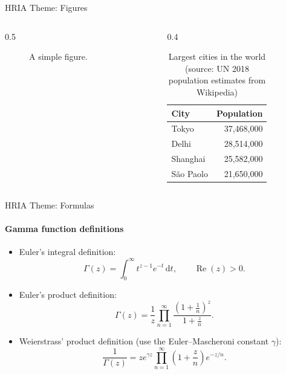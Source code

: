 \documentclass[aspectratio=169]{beamer}
\begin{document}
\begin{frame}{HRIA Theme: Figures}

\begin{columns}
\begin{column}{0.5\textwidth}
\begin{figure}
\caption{A simple figure.}
\end{figure}
\end{column}

\begin{column}{0.4\textwidth}
\centering
\begin{table}
\caption{Largest cities in the world (source: UN 2018 population estimates
from Wikipedia)}
\begin{tabular}{@{} lr @{}}
    \toprule
    City & Population\\
    \midrule
    Tokyo & 37,468,000 \\
    Delhi & 28,514,000 \\
    Shanghai & 25,582,000 \\
    São Paolo & 21,650,000 \\
    \bottomrule
\end{tabular}
\end{table}
\end{column}
\end{columns}
\end{frame}

\begin{frame}{HRIA Theme: Formulas}
\framesubtitle{Gamma function definitions}

\begin{itemize}
    \item Euler's integral definition:
    \[
    \Gamma(z) = \int_0^{\infty} t^{z-1} e^{-t} \, \mathrm{d}t, \qquad \operatorname{Re}(z) > 0.
    \]
    \item Euler's product definition:
    \[
    \Gamma(z) = \frac{1}{z} \prod_{n=1}^{\infty} \frac{\left(1 + \tfrac{1}{n}\right)^z}{1 + \tfrac{z}{n}}.
    \]
    \item Weierstrass' product definition (use the Euler--Mascheroni constant $\gamma$):
    \[
    \frac{1}{\Gamma(z)} = z e^{\gamma z} \prod_{n=1}^{\infty} \left(1 + \frac{z}{n}\right) e^{-z/n}.
    \]
\end{itemize}
\end{frame}
\end{document}
